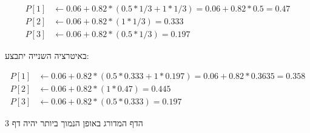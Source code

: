 \documentclass{article}
\begin{document}
\begin{align*}
    P[1] & \leftarrow 0.06+ 0.82 * (0.5 * 1/3 + 1 * 1/3)=0.06 + 0.82 * 0.5 = 0.47 \\
    P[2] & \leftarrow 0.06 + 0.82 * (1 * 1/3)=0.333                               \\
    P[3] & \leftarrow 0.06 + 0.82 * (0.5 * 1/3) = 0.197
\end{align*}

\begin{hebrew}
    באיטרציה השנייה יתבצע:
\end{hebrew}

\begin{align*}
    P[1] & \leftarrow 0.06+ 0.82 * (0.5 * 0.333 + 1 * 0.197)=0.06 + 0.82 * 0.3635 = 0.358 \\
    P[2] & \leftarrow 0.06 + 0.82 * (1 * 0.47)=0.445                                      \\
    P[3] & \leftarrow 0.06 + 0.82 * (0.5 * 0.333) = 0.197
\end{align*}

\begin{hebrew}
    הדף המדורג באופן הנמוך ביותר יהיה דף 3
\end{hebrew}
\end{document}
